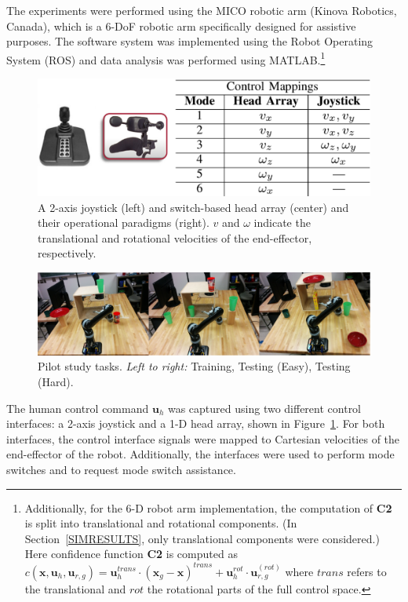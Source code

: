 \documentclass[conference]{IEEEtran}
\begin{document}
 The experiments were performed using the MICO robotic arm (Kinova Robotics, Canada), which is a 6-DoF robotic arm specifically designed for assistive purposes. The software system was implemented using the Robot Operating System (ROS) and data analysis was performed using MATLAB.\footnote{Additionally, for the 6-D robot arm implementation, the computation of \textbf{C2} is split into translational and rotational components. (In Section~\ref{SIMRESULTS}, only translational components were considered.) Here confidence function \textbf{C2} is computed as
 	$c(\boldsymbol{x}, \boldsymbol{u}_h, \boldsymbol{u}_{r,g}) = \boldsymbol{u}_{h}^{trans}\cdot(\boldsymbol{x}_{g} - \boldsymbol{x})^{trans} + \boldsymbol{u}_h^{rot}\cdot\boldsymbol{u}_{r,g}^{(rot)}$
 	where $trans$ refers to the translational and $rot$ the rotational parts of the full control space.}
 \begin{figure}[h]
 	\centering
 	\includegraphics[width = 1\hsize, height = 0.14\vsize]{./figures/INTER_4.eps}
 	\vspace{-0.35cm}
 	\caption{A 2-axis joystick (left) and switch-based head array (center) and their operational paradigms (right). $v$ and $\omega$ indicate the translational and rotational velocities of the end-effector, respectively.}
 	\label{J2_HA}
 \end{figure}
 \begin{figure}[ht]
 	\centering
 	\includegraphics[width = 1\hsize]{./figures/TASKS.png}
 	\caption{Pilot study tasks. \textit{Left to right:} Training, Testing (Easy), Testing (Hard).}
 	\label{TASKS}
 \end{figure}
 
 The human control command $\boldsymbol{u}_h$ was captured using two different control interfaces: a 2-axis joystick and a 1-D head array, shown in Figure~\ref{J2_HA}. For both interfaces, the control interface signals were mapped to Cartesian velocities of the end-effector of the robot. Additionally, the interfaces were used to perform mode switches and to
 request mode switch assistance.
 
\end{document}
